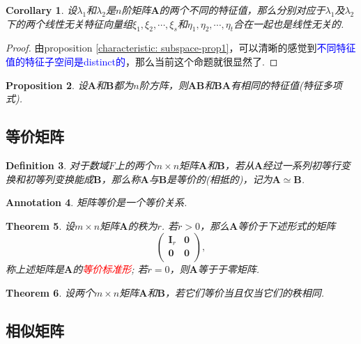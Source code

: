 \documentclass{article}
\newtheorem{theorem}{Theorem}[section]
\newtheorem{corollary}[theorem]{Corollary}
\newtheorem{proposition}[theorem]{Proposition}
\newtheorem{definition}[theorem]{Definition}
\newtheorem{annotation}[theorem]{Annotation}
\newcommand{\mbf}[1]{\bm{#1}}
\newcommand{\redt}[1]{\textcolor{red}{#1}}
\newcommand{\bluet}[1]{\textcolor{blue}{#1}}
\begin{document}
\begin{corollary}\label{characteristic: subspace-prop2}
\rm 设$\lambda_1$和$\lambda_2$是$n$阶矩阵$\mbf{A}$的两个不同的特征值，那么分别对应于$\lambda_1$及$\lambda_2$下的两个线性无关特征向量组$\xi_1,\xi_2,\cdots,\xi_s$和$\eta_1,\eta_2,\cdots,\eta_t$合在一起也是线性无关的.
\end{corollary}

\begin{proof}
由proposition \ref{characteristic: subspace-prop1}，可以清晰的感觉到\bluet{不同特征值的特征子空间是distinct的}，那么当前这个命题就很显然了. 
\end{proof}

\begin{proposition}
\rm 设$\mbf{A}$和$\mbf{B}$都为$n$阶方阵，则$\mbf{AB}$和$\mbf{BA}$有相同的特征值(特征多项式).
\end{proposition}


\newpage
\subsection{等价矩阵}

\begin{definition}
\rm 对于数域$F$上的两个$m\times n$矩阵$\mbf{A}$和$\mbf{B}$，若从$\mbf{A}$经过一系列初等行变换和初等列变换能成$\mbf{B}$，那么称$\mbf{A}$与$\mbf{B}$是等价的(相抵的)，记为$\mbf{A} \simeq \mbf{B}$.
\end{definition}

\begin{annotation}
\rm 矩阵等价是一个等价关系. 
\end{annotation}

\begin{theorem}
\rm 设$m\times n$矩阵$\mbf{A}$的秩为$r$. 若$r > 0$，那么$\mbf{A}$等价于下述形式的矩阵
$$
\begin{pmatrix}
\mbf{I}_r & \mbf{0} \\
\mbf{0} & \mbf{0} \\
\end{pmatrix},
$$
称上述矩阵是$\mbf{A}$的\redt{等价标准形}; 若$r=0$，则$\mbf{A}$等于于零矩阵.
\end{theorem}

\begin{theorem}
\rm 设两个$m\times n$矩阵$\mbf{A}$和$\mbf{B}$，若它们等价当且仅当它们的秩相同.
\end{theorem}


\newpage
\subsection{相似矩阵}
\end{document}
